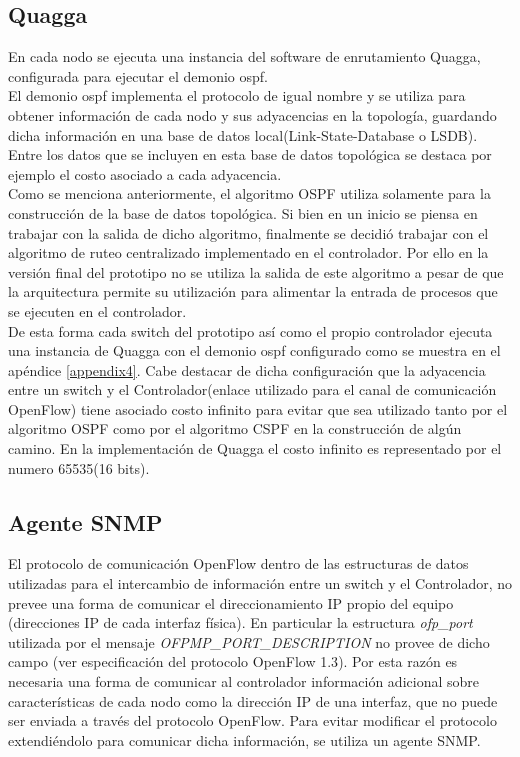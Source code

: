 \subsection{Quagga}
En cada nodo se ejecuta una instancia del software de enrutamiento Quagga, configurada para ejecutar el demonio ospf.\\ 

El demonio ospf implementa el protocolo de igual nombre y se utiliza para obtener información de cada nodo y sus adyacencias en la topolog\'ia, guardando dicha información en una base de datos local(Link-State-Database o LSDB). Entre los datos que se incluyen en esta base de datos topol\'ogica se destaca por ejemplo el costo asociado a cada adyacencia.\\ 

Como se menciona anteriormente, el algoritmo OSPF utiliza solamente para la construcci\'on de la base de datos topol\'ogica. Si bien en un inicio se piensa en trabajar con la salida de dicho algoritmo, finalmente se decidió trabajar con el algoritmo de ruteo centralizado implementado en el controlador. Por ello en la versi\'on final del prototipo no se utiliza la salida de este algoritmo a pesar de que la arquitectura permite su utilización para alimentar la entrada de procesos que se ejecuten en el controlador.\\

De esta forma cada switch del prototipo así como el propio controlador ejecuta una instancia de Quagga con el demonio ospf configurado como se muestra en el apéndice \ref{appendix4}. Cabe destacar de dicha configuración que la adyacencia entre un switch y el Controlador(enlace utilizado para el canal de comunicación OpenFlow) tiene asociado costo infinito para evitar que sea utilizado tanto por el algoritmo OSPF como por el algoritmo CSPF en la construcción de algún camino. En la implementaci\'on de Quagga el costo infinito es representado por el numero 65535(16 bits).

\subsection{Agente SNMP}
El protocolo de comunicación OpenFlow dentro de las estructuras de datos utilizadas para el intercambio de información entre un switch y el Controlador, no prevee una forma de comunicar el direccionamiento IP propio del equipo (direcciones IP de cada interfaz física). En particular la estructura \textit{ofp\_port} utilizada por el mensaje \textit{OFPMP\_PORT\_DESCRIPTION} no provee de dicho campo (ver especificación del protocolo OpenFlow 1.3\citep{ofv133spec}). Por esta razón es necesaria una forma de comunicar al controlador información adicional sobre características de cada nodo como la dirección IP de una interfaz, que no puede ser enviada a través del protocolo OpenFlow. Para evitar modificar el protocolo extendiéndolo para comunicar dicha informaci\'on, se utiliza un agente SNMP.\\

